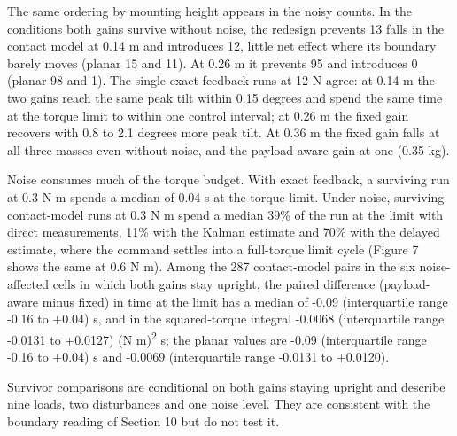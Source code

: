 \documentclass[11pt,a4paper]{article}
\begin{document}
The same ordering by mounting height appears in the noisy counts. In the conditions both gains survive without noise, the redesign prevents 13 falls in the contact model at 0.14 m and introduces 12, little net effect where its boundary barely moves (planar 15 and 11). At 0.26 m it prevents 95 and introduces 0 (planar 98 and 1). The single exact-feedback runs at 12 N agree: at 0.14 m the two gains reach the same peak tilt within 0.15 degrees and spend the same time at the torque limit to within one control interval; at 0.26 m the fixed gain recovers with 0.8 to 2.1 degrees more peak tilt. At 0.36 m the fixed gain falls at all three masses even without noise, and the payload-aware gain at one (0.35 kg).

Noise consumes much of the torque budget. With exact feedback, a surviving run at 0.3 N m spends a median of 0.04 s at the torque limit. Under noise, surviving contact-model runs at 0.3 N m spend a median 39\% of the run at the limit with direct measurements, 11\% with the Kalman estimate and 70\% with the delayed estimate, where the command settles into a full-torque limit cycle (Figure 7 shows the same at 0.6 N m). Among the 287 contact-model pairs in the six noise-affected cells in which both gains stay upright, the paired difference (payload-aware minus fixed) in time at the limit has a median of -0.09 (interquartile range -0.16 to +0.04) s, and in the squared-torque integral -0.0068 (interquartile range -0.0131 to +0.0127) (N m)\textsuperscript{2} s; the planar values are -0.09 (interquartile range -0.16 to +0.04) s and -0.0069 (interquartile range -0.0131 to +0.0120).

Survivor comparisons are conditional on both gains staying upright and describe nine loads, two disturbances and one noise level. They are consistent with the boundary reading of Section 10 but do not test it.

\clearpage
\end{document}
